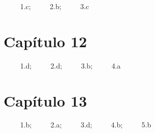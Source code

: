 \documentclass[
]{book}
\begin{document}
\(\qquad\) 1.c; \(\qquad\) 2.b; \(\qquad\) 3.c

\hypertarget{capuxedtulo-12}{%
\section{Capítulo 12}\label{capuxedtulo-12}}

\(\qquad\) 1.d; \(\qquad\) 2.d; \(\qquad\) 3.b; \(\qquad\) 4.a

\hypertarget{capuxedtulo-13}{%
\section{Capítulo 13}\label{capuxedtulo-13}}

\(\qquad\) 1.b; \(\qquad\) 2.a; \(\qquad\) 3.d; \(\qquad\) 4.b; \(\qquad\) 5.b

  
\end{document}
